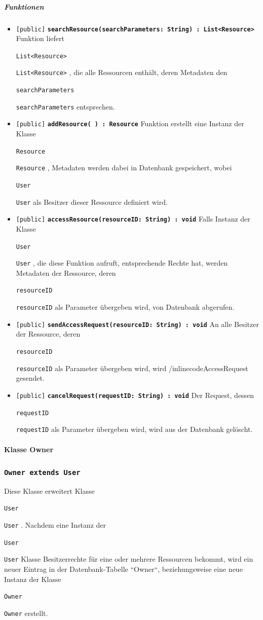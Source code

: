 \documentclass[parskip=full,11pt]{scrartcl}
\makeatletter
\newcommand{\lstInline}[2][,]{%
	\begingroup%
	\lstset{#1}%
	\begin{lrbox}{\mylisting}\lstinline!#2!\end{lrbox}%
	\setlength{\@tempdima}{\linegoal}%
	\ifdim\wd\mylisting>\@tempdima\hfill\\\fi%
	\lstinline!#2!%
	\endgroup%
}
\newcommand{\class}[1]{\subsubsection*{\lstinline[basicstyle=\ttfamily\large]{#1}}}
\newcommand{\mtd}[5]{\lstinline{[#4]} \textbf{\lstinline{#1(#3) : #2}} \newline #5}
\newcommand{\inlinecode}[1]{\lstInline[breaklines=true]{#1}}
\makeatother
\begin{document}
\subparagraph*{Funktionen}  %
\begin{itemize}
	\item \mtd{searchResource}{List<Resource>}{searchParameters: String} {public}{Funktion liefert  \inlinecode{List<Resource>}, die alle Ressourcen enthält, deren Metadaten den \inlinecode{searchParameters} entsprechen.}
	
	\item \mtd{addResource}{Resource}{ }{public}{Funktion erstellt eine Instanz der Klasse \inlinecode{Resource}, Metadaten werden dabei in Datenbank gespeichert, wobei \inlinecode{User} als Besitzer dieser Ressource definiert wird.}
	
	\item \mtd{accessResource}{void}{resourceID: String} {public}{Falls Instanz der Klasse \inlinecode{User}, die diese Funktion aufruft, entsprechende Rechte hat, werden Metadaten der Ressource, deren \inlinecode{resourceID} als Parameter übergeben wird, von Datenbank abgerufen.}
	
	\item \mtd{sendAccessRequest}{void}{resourceID: String} {public}
	{An alle Besitzer der Ressource, deren \inlinecode{resourceID} als Parameter übergeben wird, wird /inlinecode{AccessRequest} gesendet.}
	
	\item \mtd{cancelRequest}{void}{requestID: String} {public}{Der Request, dessen \inlinecode{requestID}} als Parameter übergeben wird, wird aus der Datenbank gelöscht.
\end{itemize}

\newpage
  \paragraph*{Klasse Owner}
 \class{Owner extends User}
Diese Klasse erweitert Klasse \inlinecode{User}. Nachdem eine Instanz der \inlinecode{User} Klasse Besitzerrechte für eine oder mehrere Ressourcen bekommt, wird ein neuer Eintrag in der Datenbank-Tabelle ``Owner``, beziehungsweise eine neue Instanz der Klasse \inlinecode{Owner} erstellt. 
\end{document}
